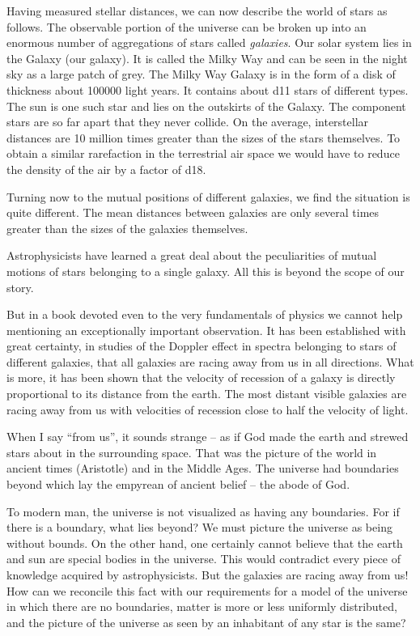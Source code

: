 Having measured stellar distances, we can now describe the world of stars as follows. The observable portion of the universe can be broken up into an enormous number of aggregations of stars called \emph{galaxies}. Our solar system lies in the Galaxy (our galaxy). It is called the Milky Way and can be seen in the night sky as a large patch of grey. The Milky Way Galaxy is in the form of a disk of thickness about \num{100000} light years. It contains about \num{d11} stars of different types. The sun is one such star and lies on the outskirts of the Galaxy. The component stars are so far apart that they never collide. On the average, interstellar distances are 10 million times greater than the sizes of the stars themselves. To obtain a similar rarefaction in the terrestrial air space we would have to reduce the density of the air by a factor of \num{d18}.


Turning now to the mutual positions of different gal­axies, we find the situation is quite different. The mean distances between galaxies are only several times greater than the sizes of the galaxies themselves.

Astrophysicists have learned a great deal about the peculiarities of mutual motions of stars belonging to a single galaxy. All this is beyond the scope of our story.

But in a book devoted even to the very fundamentals of physics we cannot help mentioning an exceptionally im­portant observation. It has been established with great certainty, in studies of the Doppler effect in spectra belonging to stars of different galaxies, that all galaxies are racing away from us in all directions. What is more, it has been shown that the velocity of recession of a galaxy is directly proportional to its distance from the earth. The most distant visible galaxies are racing away from us with velocities of recession close to half the velocity of light.

When I say ``from us'', it sounds strange -- as if God made the earth and strewed stars about in the surrounding space. That was the picture of the world in ancient times (Aristotle) and in the Middle Ages. The universe had boundaries beyond which lay the empyrean of ancient belief -- the abode of God.

To modern man, the universe is not visualized as having any boundaries. For if there is a boundary, what lies beyond? We must picture the universe as being without bounds. On the other hand, one certainly cannot believe that the earth and sun are special bodies in the universe. This would contradict every piece of knowledge acquired by astrophysicists. But the galaxies are racing away from us! How can we reconcile this fact with our requirements for a model of the universe in which there are no bound­aries, matter is more or less uniformly distributed, and the picture of the universe as seen by an inhabitant of any star is the same?

